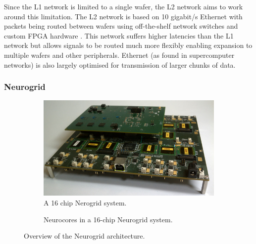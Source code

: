 				Since the L1 network is limited to a single wafer, the L2 network aims
				to work around this limitation. The L2 network is based on 10 gigabit/s
				Ethernet with packets being routed between wafers using off-the-shelf
				network switches and custom FPGA hardware \cite{schemmel10}. This
				network suffers higher latencies than the L1 network but allows signals
				to be routed much more flexibly enabling expansion to multiple wafers
				and other peripherals.  Ethernet (as found in supercomputer networks) is
				also largely optimised for transmission of larger chunks of data.
			
			\subsubsection{Neurogrid}
				
				\begin{figure}
				\end{figure}
				
				\begin{figure}
					\begin{subfigure}[b]{0.49\textwidth}
						\center
						\includegraphics[width=\textwidth]{figures/neurogrid}
						\vspace{0.2cm}
						
						\caption{A 16 chip Nerogrid system.}
						\label{fig:neurogrid}
					\end{subfigure}
					\begin{subfigure}[b]{0.49\textwidth}
						\center
						
						\caption{Neurocores in a 16-chip Neurogrid system.}
						\label{fig:neurogrid-topology}
					\end{subfigure}
					
					\caption{Overview of the Neurogrid architecture.}
					\label{fig:neurogrid-arch-overview}
				\end{figure}
				
